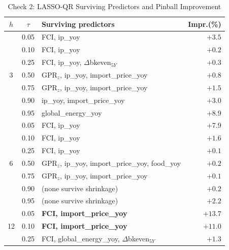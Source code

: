 \documentclass[12pt]{article}
\begin{document}
\begin{table}[htbp]\begin{center}
\caption{Check 2: LASSO-QR Surviving Predictors and Pinball Improvement}
\label{tab:lasso}
\begin{threeparttable}\small\setlength{\tabcolsep}{7pt}
\begin{tabular}{@{}cc>{\raggedright\arraybackslash}p{6.2cm}r@{}}
\toprule
$h$ & $\tau$ & Surviving predictors & Impr.(\%)\\
\midrule
\multirow{7}{*}{3}
 & 0.05 & FCI, ip\_yoy                                          & $+3.5$\\
 & 0.10 & FCI, ip\_yoy                                          & $+0.2$\\
 & 0.25 & FCI, ip\_yoy, $\Delta$bkeven$_{5Y}$                   & $+0.3$\\
 & 0.50 & GPR$_z$, ip\_yoy, import\_price\_yoy                  & $+0.8$\\
 & 0.75 & GPR$_z$, ip\_yoy, import\_price\_yoy                  & $+1.5$\\
 & 0.90 & ip\_yoy, import\_price\_yoy                           & $+3.0$\\
 & 0.95 & global\_energy\_yoy                                   & $+8.9$\\
\midrule
\multirow{7}{*}{6}
 & 0.05 & FCI, ip\_yoy                                          & $+7.9$\\
 & 0.10 & FCI, ip\_yoy                                          & $+1.6$\\
 & 0.25 & FCI, ip\_yoy                                          & $+0.1$\\
 & 0.50 & GPR$_z$, ip\_yoy, import\_price\_yoy, food\_yoy       & $+0.2$\\
 & 0.75 & GPR$_z$, ip\_yoy, import\_price\_yoy                  & $+0.1$\\
 & 0.90 & (none survive shrinkage)                              & $+0.2$\\
 & 0.95 & (none survive shrinkage)                              & $+2.2$\\
\midrule
\multirow{7}{*}{12}
 & \cellcolor{yellow!25}0.05 & \cellcolor{yellow!25}\textbf{FCI, import\_price\_yoy}  & \cellcolor{yellow!25}$\mathbf{+13.7}$\\
 & \cellcolor{yellow!25}0.10 & \cellcolor{yellow!25}\textbf{FCI, import\_price\_yoy}  & \cellcolor{yellow!25}$\mathbf{+11.0}$\\
 & 0.25 & FCI, global\_energy\_yoy, $\Delta$bkeven$_{5Y}$       & $+1.3$\\

\end{tabular}
\end{threeparttable}
\end{center}
\end{table}
\end{document}
